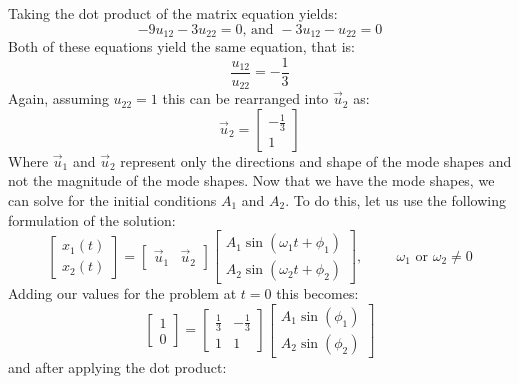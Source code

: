 \documentclass[12pt,letter]{article}
\begin{document}
\begin{example}
\begin{equation}
	\end{equation}
	Taking the dot product of the matrix equation yields:
	\begin{equation}
		-9u_{12} -3u_{22}=0 \text{, and } -3u_{12} - u_{22}=0
	\end{equation}
	Both of these equations yield the same equation, that is:
	\begin{equation}
		\frac{u_{12}}{u_{22}} =-\frac{1}{3}
	\end{equation}
	Again, assuming $u_{22}=1$  this can be rearranged into $\vec{u}_2$ as:
	\begin{equation}
		 \vec{u}_2 = \begin{bmatrix} -\frac{1}{3}\\ 1\end{bmatrix}
	\end{equation}
	Where $\vec{u}_1$ and $\vec{u}_2$ represent only the directions and shape of the mode shapes and not the magnitude of the mode shapes. 
	Now that we have the mode shapes, we can solve for the initial conditions $A_1$ and $A_2$. To do this, let us use the following formulation of the solution:
	\begin{equation}
		 \begin{bmatrix} x_1(t) \\  x_2(t) \end{bmatrix} =  \begin{bmatrix} \vec{u}_1 & \vec{u}_2 \end{bmatrix}
		 \begin{bmatrix} A_1 \sin (\omega_1 t + \phi_1 )\\ A_2 \sin (\omega_2 t + \phi_2 )\end{bmatrix}, \hspace{1cm} \omega_1 \text{ or } \omega_2 \neq 0
	\end{equation}
	Adding our values for the problem at $t=0$ this becomes:
	\begin{equation}
		 \begin{bmatrix} 1 \\  0 \end{bmatrix} =  \begin{bmatrix} \frac{1}{3} & -\frac{1}{3} \\ 1 & 1 \end{bmatrix}
		 \begin{bmatrix} A_1 \sin (\phi_1)\\ A_2 \sin (\phi_2)\end{bmatrix}
	\end{equation}
	and after applying the dot product:

\end{example}
\end{document}
